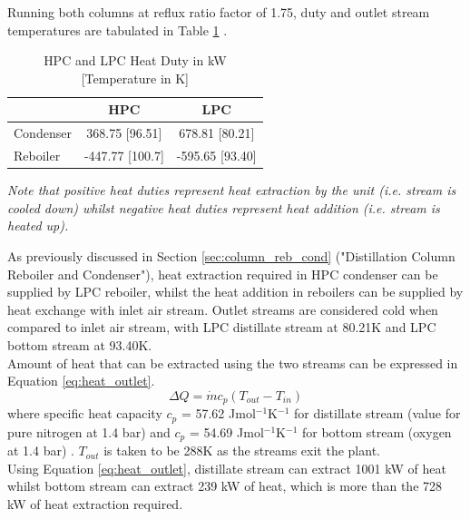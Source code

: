 		\noindent Running both columns at reflux ratio factor of 1.75, duty and outlet stream temperatures are tabulated in Table \ref{table:duty} \citep{nist}.
		\begin{table}[H]
        \centering
            \singlespacing
	        \caption{HPC and LPC Heat Duty in kW [Temperature in K]}
	        \label{table:duty}
	
	        \begin{tabular}{|l|cc|}
	        \hline
    	                    & HPC	            & LPC \\    \hline
	        Condenser		& 368.75  [96.51]	& 678.81  [80.21] \\
	        Reboiler  		& -447.77  [100.7]	& -595.65  [93.40] \\    \hline
	        \end{tabular}
	        \vspace{1ex}
	        
	        \raggedright \emph{Note that positive heat duties represent heat extraction by the unit (i.e. stream is cooled down) whilst negative heat duties represent heat addition (i.e. stream is heated up).}
        \end{table}
        \noindent As previously discussed in Section \ref{sec:column_reb_cond} ("Distillation Column Reboiler and Condenser"), heat extraction required in HPC condenser can be supplied by LPC reboiler, whilst the heat addition in reboilers can be supplied by heat exchange with inlet air stream.
	    Outlet streams are considered cold when compared to inlet air stream, with LPC distillate stream at 80.21K and LPC bottom stream at 93.40K. \\
	    Amount of heat that can be extracted using the two streams can be expressed in Equation \ref{eq:heat_outlet}.
	    \begin{equation}
	        \Delta Q = \dot{m}c_p \left(T_{out} - T_{in}\right)
	        \label{eq:heat_outlet}
	    \end{equation}
        where specific heat capacity $c_p$ = 57.62 Jmol$^{-1}$K$^{-1}$ for distillate stream (value for pure nitrogen at 1.4 bar) and $c_p$ = 54.69 Jmol$^{-1}$K$^{-1}$ for bottom stream (oxygen at 1.4 bar) \citep{nist}. $T_{out}$ is taken to be 288K as the streams exit the plant. \\
        Using Equation \ref{eq:heat_outlet}, distillate stream can extract 1001 kW of heat whilst bottom stream can extract 239 kW of heat, which is more than the 728 kW of heat extraction required.
